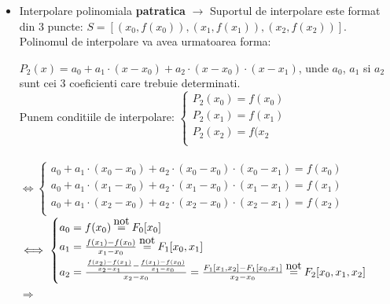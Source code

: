 \documentclass{article}
\newcommand\eqnot{\stackrel{\mathclap{\normalfont\mbox{not}}}{=}}
\begin{document}
\begin{itemize}
\begin{itemize}
        \item Interpolare polinomiala \textbf{patratica} $\rightarrow$ Suportul de interpolare este format din 3 puncte: $S=[(x_0, f(x_0)), (x_1, f(x_1)), (x_2, f(x_2))]$.\\
        Polinomul de interpolare va avea urmatoarea forma:
        
        $P_2(x) = a_0 + a_1 \cdot (x-x_0) + a_2 \cdot (x-x_0) \cdot (x-x_1)$, unde $a_0$, $a_1$ si $a_2$ sunt cei 3 coeficienti care trebuie determinati.\\
        Punem conditiile de interpolare:
        $\begin{cases}
          P_2(x_0) = f(x_0)\\
          P_2(x_1) = f(x_1)\\
          P_2(x_2) = f(x_2 \\
        \end{cases}$\\\\
        $\iff \begin{cases}
          a_0 + a_1 \cdot (x_0 - x_0) + a_2 \cdot (x_0 - x_0) \cdot (x_0 - x_1) = f(x_0)\\
          a_0 + a_1 \cdot (x_1 - x_0) + a_2 \cdot (x_1 - x_0) \cdot (x_1 - x_1) = f(x_1)\\
          a_0 + a_1 \cdot (x_2 - x_0) + a_2 \cdot (x_2 - x_0) \cdot (x_2 - x_1) = f(x_2)\\
        \end{cases}$\\
        $\iff \begin{cases}
          a_0 = f(x_0) \;\eqnot\; F_0[x_0]\\ \vspace{0.15cm}
          a_1 = \frac{f(x_1) - f(x_0)}{x_1 - x_0}\;\eqnot\; F_1[x_0,x _1]\\ \vspace{0.15cm}
          a_2 = \frac{\frac{f(x_2) - f(x_1)}{x_2 - x_1} - \frac{f(x_1) - f(x_0)}{x_1 - x_0}}{x_2 - x_0} = \frac{F_1[x_1, x_2]- F_1[x_0, x_1]}{x_2 - x_0}\; \eqnot\; F_2[x_0, x_1, x_2]
        \end{cases}$\\
        $\Longrightarrow$ 
    \end{itemize}
    

\end{itemize}
\end{document}
